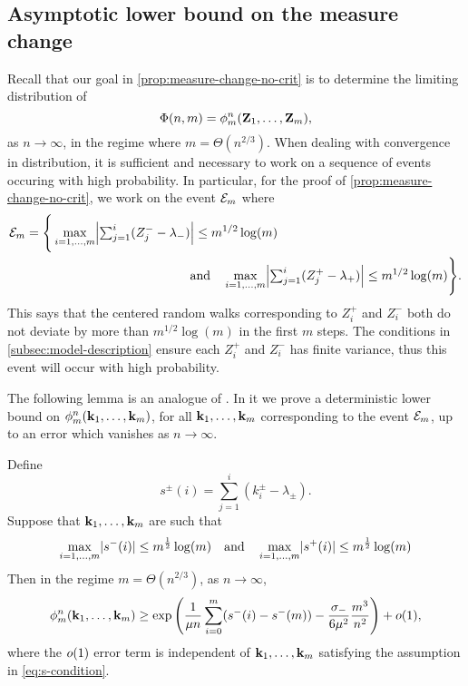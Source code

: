 \subsection{Asymptotic lower bound on the measure change}

Recall that our goal in \cref{prop:measure-change-no-crit} is to determine the limiting distribution of
\begin{equation*}
    \Phi(n, m) = \phi^n_m({\mathbf Z}_1, \ldots, {\mathbf Z}_m),
\end{equation*}
as $n \to \infty$, in the regime where $m = \Theta(n^{2/3})$. When dealing with convergence in distribution, it is sufficient and necessary to work on a sequence of events occuring with high probability. In particular, for the proof of \cref{prop:measure-change-no-crit}, we work on the event $\mathcal E_m$ where
\begin{align*}
    \walkDeviationEvent_m
    &= \Bigg\{ 
    \max_{i=1, \ldots, m } \abs*{
        \textstyle\sum_{j=1}^i (Z^{-}_j - \lambda_{-}) 
    } \leq m^{1/2} \log(m) \\
    &\hspace{13em} \text{and} \quad
    \max_{i=1, \ldots, m } \abs*{
        \textstyle\sum_{j=1}^i (Z^{+}_j - \lambda_{+}) 
    } \leq m^{1/2} \log(m)
    \Bigg\}.
\end{align*}
This says that the centered random walks corresponding to $Z^+_i$ and $Z^-_i$ both do not deviate by more than $m^{1/2} \log(m)$ in the first $m$ steps. The conditions in \cref{subsec:model-description} ensure each $Z^+_i$ and $Z^-_i$ has finite variance, thus this event will occur with high probability. 

The following lemma is an analogue of \citet[Lemma 6.7]{conchon--kerjanStableGraphMetric2021}. In it we prove a deterministic lower bound on $\phi^n_m({\mathbf k}_1, \ldots, {\mathbf k}_m)$, for all ${\mathbf k}_1, \ldots, {\mathbf k}_m$ corresponding to the event $\mathcal E_m$, up to an error which vanishes as $n \to \infty$.
\begin{proposition}
    \label{prop:measure-change-approx}
    Define
    \begin{equation*}
        s^{\pm}(i) = \textstyle{\sum_{j=1}^i (k_i^{\pm} - \lambda_{\pm})}.
    \end{equation*}
    Suppose that ${\mathbf k}_1, \ldots, {\mathbf k}_m$ are such that
    \begin{equation}
        \label{eq:s-condition}
        \max_{i=1, \ldots, m} \lvert s^{-}(i)\rvert \leq m^{\frac{1}{2}} \log(m)
        \quad \text{and} \quad
        \max_{i=1, \ldots, m} \lvert s^{+}(i)\rvert \leq m^{\frac{1}{2}} \log(m)
    \end{equation}
    Then in the regime $m = \Theta(n^{2/3})$, as $n \to \infty$,
    \begin{equation*}
        \phi^n_m({\mathbf k}_1, \ldots, {\mathbf k}_m)
        \geq \exp\left( \frac{1}{\mu n} \sum_{i=0}^m (s^-(i) - s^-(m)) - \frac{\sigma_-}{6 \mu^2} \frac{m^3}{n^2} \right) + o(1),
    \end{equation*}
    where the $o(1)$ error term is independent of ${\mathbf k}_1, \ldots, {\mathbf k}_m$ satisfying the assumption in \cref{eq:s-condition}.
\end{proposition}


